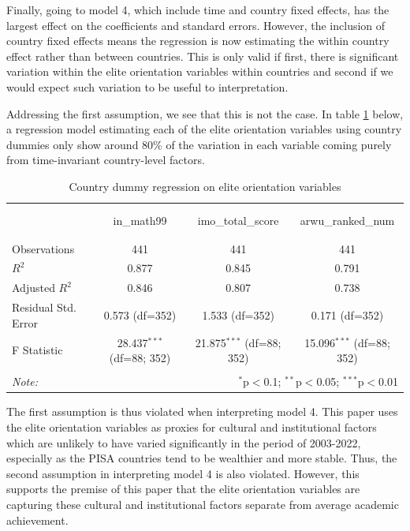 \documentclass[11pt]{article}
\begin{document}
Finally, going to model 4, which include time and country fixed effects, has the largest effect on the coefficients and standard errors. However, the inclusion of country fixed effects means the regression is now estimating the within country effect rather than between countries. This is only valid if first, there is significant variation within the elite orientation variables within countries and second if we would expect such variation to be useful to interpretation.

Addressing the first assumption, we see that this is not the case. In table \ref{table:dummyreg} below, a regression model estimating each of the elite orientation variables using country dummies only show around 80\% of the variation in each variable coming purely from time-invariant country-level factors.

\begin{table}[!htbp] \centering
    \caption{Country dummy regression on elite orientation variables}
    \label{table:dummyreg}
    \resizebox{\linewidth}{!} {
    \begin{tabular}{@{\extracolsep{5pt}}lccc}
    \\[-1.8ex]\hline
    \hline \\[-1.8ex]
    \\[-1.8ex] & \multicolumn{1}{c}{in\_math99} & \multicolumn{1}{c}{imo\_total\_score} & \multicolumn{1}{c}{arwu\_ranked\_num}  \\
    \hline \\[-1.8ex]
    \hline \\[-1.8ex]
     Observations & 441 & 441 & 441 \\
     $R^2$ & 0.877 & 0.845 & 0.791 \\
     Adjusted $R^2$ & 0.846 & 0.807 & 0.738 \\
     Residual Std. Error & 0.573 (df=352) & 1.533 (df=352) & 0.171 (df=352) \\
     F Statistic & 28.437$^{***}$ (df=88; 352) & 21.875$^{***}$ (df=88; 352) & 15.096$^{***}$ (df=88; 352) \\
    \hline
    \hline \\[-1.8ex]
    \textit{Note:} & \multicolumn{3}{r}{$^{*}$p$<$0.1; $^{**}$p$<$0.05; $^{***}$p$<$0.01} \\
    \end{tabular}
    }
\end{table}
The first assumption is thus violated when interpreting model 4. This paper uses the elite orientation variables as proxies for cultural and institutional factors which are unlikely to have varied significantly in the period of 2003-2022, especially as the PISA countries tend to be wealthier and more stable. Thus, the second assumption in interpreting model 4 is also violated. However, this supports the premise of this paper that the elite orientation variables are capturing these cultural and institutional factors separate from average academic achievement.
\end{document}
